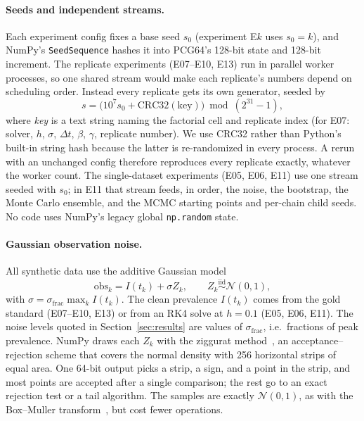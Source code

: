 \paragraph{Seeds and independent streams.} Each experiment config fixes a base seed $s_0$
(experiment E$k$ uses $s_0 = k$), and NumPy's \texttt{SeedSequence} hashes it into PCG64's 128-bit
state and 128-bit increment. The replicate experiments (E07--E10, E13) run in parallel worker
processes, so one shared stream would make each replicate's numbers depend on scheduling order.
Instead every replicate gets its own generator, seeded by
\begin{equation}
  s = \big(10^7 s_0 + \mathrm{CRC32}(\mathrm{key})\big) \bmod (2^{31}-1), \label{eq:seed}
\end{equation}
where \emph{key} is a text string naming the factorial cell and replicate index (for E07: solver,
$h$, $\sigma$, $\Delta t$, $\beta$, $\gamma$, replicate number). We use CRC32 rather than Python's
built-in string hash because the latter is re-randomized in every process. A rerun with an
unchanged config therefore reproduces every replicate exactly, whatever the worker count. The
single-dataset experiments (E05, E06, E11) use one stream seeded with $s_0$; in E11 that stream
feeds, in order, the noise, the bootstrap, the Monte Carlo ensemble, and the MCMC starting points
and per-chain child seeds. No code uses NumPy's legacy global \texttt{np.random} state.

\paragraph{Gaussian observation noise.} All synthetic data use the additive Gaussian model
\begin{equation}
  \mathrm{obs}_k = I(t_k) + \sigma Z_k, \qquad Z_k \overset{\text{iid}}{\sim} \mathcal{N}(0,1),
  \label{eq:noise}
\end{equation}
with $\sigma = \sigma_{\mathrm{frac}} \max_k I(t_k)$. The clean prevalence $I(t_k)$ comes from the
gold standard (E07--E10, E13) or from an RK4 solve at $h=0.1$ (E05, E06, E11). The noise levels
quoted in Section~\ref{sec:results} are values of $\sigma_{\mathrm{frac}}$, i.e.\ fractions of peak
prevalence. NumPy draws each $Z_k$ with the ziggurat method~\cite{marsaglia2000ziggurat}, an
acceptance--rejection scheme that covers the normal density with 256 horizontal strips of equal
area. One 64-bit output picks a strip, a sign, and a point in the strip, and most points are
accepted after a single comparison; the rest go to an exact rejection test or a tail algorithm. The samples are exactly
$\mathcal{N}(0,1)$, as with the Box--Muller transform~\cite{banks2010}, but cost fewer operations.

